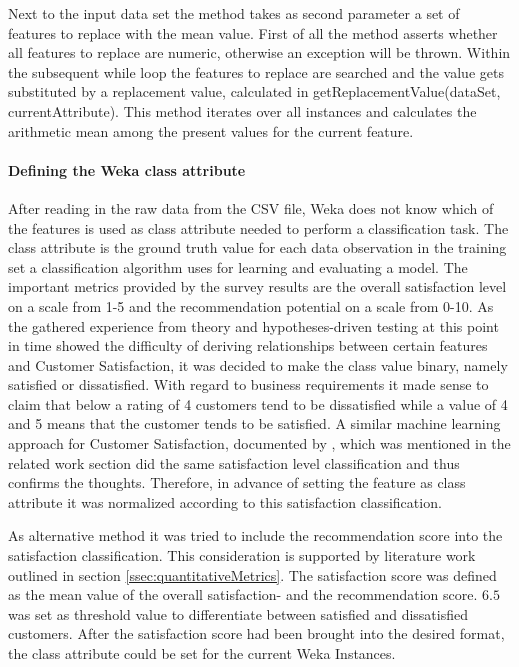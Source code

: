 Next to the input data set the method takes as second parameter a set of features to replace with the mean value. First of all the method asserts whether all features to replace are numeric, otherwise an exception will be thrown. Within the subsequent while loop the features to replace are searched and the value gets substituted by a replacement value, calculated in getReplacementValue(dataSet, currentAttribute). This method iterates over all instances and calculates the arithmetic mean among the present values for the current feature.


\paragraph{Defining the Weka class attribute}
After reading in the raw data from the CSV file, Weka does not know which of the features is used as class attribute needed to perform a classification task. The class attribute is the ground truth value for each data observation in the training set a classification algorithm uses for learning and evaluating a model. The important metrics provided by the survey results are the overall satisfaction level on a scale from 1-5 and the recommendation potential on a scale from 0-10. As the gathered experience from theory and hypotheses-driven testing at this point in time showed the difficulty of deriving relationships between certain features and Customer Satisfaction, it was decided to make the class value binary, namely satisfied or dissatisfied. With regard to business requirements it made sense to claim that below a rating of 4 customers tend to be dissatisfied while a value of 4 and 5 means that the customer tends to be satisfied. A similar machine learning approach for Customer Satisfaction, documented by \cite{meinzer2016can}, which was mentioned in the related work section did the same satisfaction level classification and thus confirms the thoughts. Therefore, in advance of setting the feature as class attribute it was normalized according to this satisfaction classification. 

As alternative method it was tried to include the recommendation score into the satisfaction classification. This consideration is supported by literature work outlined in section \ref{ssec:quantitativeMetrics}. The satisfaction score was defined as the mean value of the overall satisfaction- and the recommendation score. $6.5$ was set as threshold value to differentiate between satisfied and dissatisfied customers. After the satisfaction score had been brought into the desired format, the class attribute could be set for the current Weka Instances.

